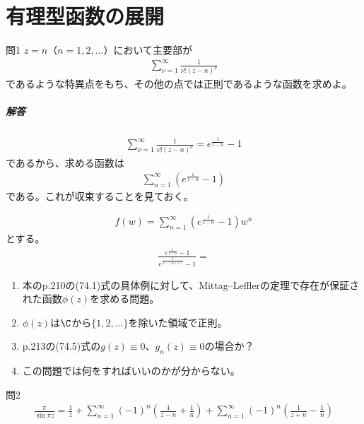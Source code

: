 \chapter{有理型函数の展開}%

\begin{mysimplebox}{問1}
    $z=n$（$n=1,2,\dots$）において主要部が
    \begin{align*}
        \sum_{\nu=1}^{\infty}\frac{1}{\nu!(z-n)^\nu}
    \end{align*}
    であるような特異点をもち、その他の点では正則であるような函数を求めよ。
\end{mysimplebox}
\paragraph{解答}
\begin{align*}
    \sum_{\nu=1}^{\infty}\frac{1}{\nu!(z-n)^\nu}=e^{\frac{1}{z-n}}-1
\end{align*}
であるから、求める函数は
\begin{align*}
    \sum_{n=1}^{\infty}(e^{\frac{1}{z-n}}-1)
\end{align*}
である。これが収束することを見ておく。

\begin{align*}
    f(w)=\sum_{n=1}^{\infty}(e^{\frac{1}{z-n}}-1)w^n
\end{align*}
とする。
\begin{align*}
    \frac{e^{\frac{1}{z-n}}-1}{e^{\frac{1}{z-(n+1)}}-1}
    =
\end{align*}

\begin{enumerate}
    \item 本のp.210の(74.1)式の具体例に対して、Mittag--Lefflerの定理で存在が保証された函数$\phi(z)$を求める問題。
    \item $\phi(z)$は$\C$から$\{1,2,\dots\}$を除いた領域で正則。
    \item p.213の(74.5)式の$g(z)\equiv0$、$g_n(z)\equiv0$の場合か？
    \item この問題では何をすればいいのかが分からない。
\end{enumerate}

\newpage
\begin{mysimplebox}{問2}
    \begin{align*}
        \frac{\pi}{\sin\pi z}=\frac1z
        +\sum_{n=1}^{\infty}(-1)^n\left(\frac{1}{z-n}+\frac1n\right)
        +\sum_{n=1}^{\infty}(-1)^n\left(\frac{1}{z+n}-\frac1n\right)
    \end{align*}
\end{mysimplebox}

